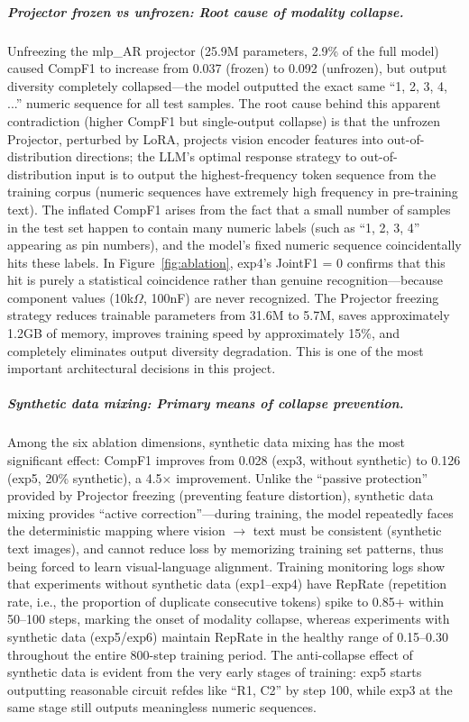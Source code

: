 \subparagraph{Projector frozen vs unfrozen: Root cause of modality collapse.}
Unfreezing the mlp\_AR projector (25.9M parameters, 2.9\% of the full model) caused CompF1 to increase from 0.037 (frozen) to 0.092 (unfrozen), but output diversity completely collapsed---the model outputted the exact same ``1, 2, 3, 4, ...'' numeric sequence for all test samples. The root cause behind this apparent contradiction (higher CompF1 but single-output collapse) is that the unfrozen Projector, perturbed by LoRA, projects vision encoder features into out-of-distribution directions; the LLM's optimal response strategy to out-of-distribution input is to output the highest-frequency token sequence from the training corpus (numeric sequences have extremely high frequency in pre-training text). The inflated CompF1 arises from the fact that a small number of samples in the test set happen to contain many numeric labels (such as ``1, 2, 3, 4'' appearing as pin numbers), and the model's fixed numeric sequence coincidentally hits these labels. In Figure~\ref{fig:ablation}, exp4's JointF1 = 0 confirms that this hit is purely a statistical coincidence rather than genuine recognition---because component values (10k$\Omega$, 100nF) are never recognized. The Projector freezing strategy reduces trainable parameters from 31.6M to 5.7M, saves approximately 1.2GB of memory, improves training speed by approximately 15\%, and completely eliminates output diversity degradation. This is one of the most important architectural decisions in this project.

\subparagraph{Synthetic data mixing: Primary means of collapse prevention.}
Among the six ablation dimensions, synthetic data mixing has the most significant effect: CompF1 improves from 0.028 (exp3, without synthetic) to 0.126 (exp5, 20\% synthetic), a 4.5$\times$ improvement. Unlike the ``passive protection'' provided by Projector freezing (preventing feature distortion), synthetic data mixing provides ``active correction''---during training, the model repeatedly faces the deterministic mapping where vision $\to$ text must be consistent (synthetic text images), and cannot reduce loss by memorizing training set patterns, thus being forced to learn visual-language alignment. Training monitoring logs show that experiments without synthetic data (exp1--exp4) have RepRate (repetition rate, i.e., the proportion of duplicate consecutive tokens) spike to 0.85+ within 50--100 steps, marking the onset of modality collapse, whereas experiments with synthetic data (exp5/exp6) maintain RepRate in the healthy range of 0.15--0.30 throughout the entire 800-step training period. The anti-collapse effect of synthetic data is evident from the very early stages of training: exp5 starts outputting reasonable circuit refdes like ``R1, C2'' by step 100, while exp3 at the same stage still outputs meaningless numeric sequences.

